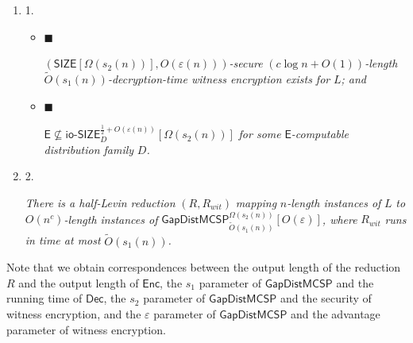 \begin{enumerate}


\item[] 
1. 


\begin{itemize}


\item[] 
$\blacksquare$ 


$\left({\mathsf{SIZE}}[\Omega(s_{2}(n))],O(\varepsilon(n))\right)$\emph{-secure }$(c\log n+O(1))$\emph{-length }$\widetilde{O}(s_{1}(n))$\emph{-decryption-time witness encryption exists for }$L$\emph{; and}\par





\item[] 
$\blacksquare$ 


${\mathsf{E}}\nsubseteq{\mathsf{io\text{-}}}{\mathsf{SIZE}}_{D}^{\frac{1}{2}+O(\varepsilon(n))}[\Omega(s_{2}(n))]$\emph{ for some }${\mathsf{E}}$\emph{-computable distribution family }$D$\emph{.}\par





\end{itemize}





\item[] 
2. 


\emph{There is a half-Levin reduction }$(R,R_{wit})$\emph{ mapping }$n$\emph{-length instances of }$L$\emph{ to }$O(n^{c})$\emph{-length instances of
}${\mathsf{GapDistMCSP}}_{\widetilde{O}(s_{1}(n))}^{\Omega(s_{2}(n))}[O(\varepsilon)]$\emph{, where }$R_{wit}$\emph{ runs in time at most }$\widetilde{O}(s_{1}(n))$\emph{.}\par





\end{enumerate}






Note that we obtain correspondences between the output length of the reduction $R$ and the output length of ${\mathsf{Enc}}$, the $s_{1}$ parameter of ${\mathsf{GapDistMCSP}}$ and the running time of ${\mathsf{Dec}}$, the $s_{2}$ parameter of ${\mathsf{GapDistMCSP}}$ and the security of witness encryption, and the $\varepsilon$ parameter of ${\mathsf{GapDistMCSP}}$ and the advantage parameter of witness encryption.\par





